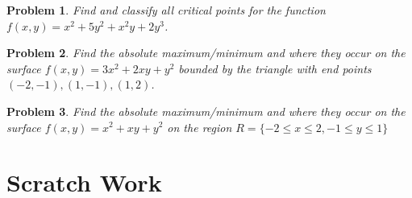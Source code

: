 \documentclass[11pt]{article}
\newtheorem{problem}{Problem}
\begin{document}
\begin{problem}
    Find and classify \emph{all} critical points for the function $f(x,y) = x^2+5y^2+x^2y+2y^3$.
\end{problem}

\newpage


\begin{problem}
    Find the absolute maximum/minimum and where they occur on the surface $f(x,y) = 3x^2+2xy+y^2$ bounded by the triangle with end points $(-2,-1),(1,-1),(1,2)$.
\end{problem}

\newpage

\begin{problem}
    Find the absolute maximum/minimum and where they occur on the surface $f(x,y) = x^2+xy+y^2$ on the region $R= \{-2\leq x\leq 2, -1\leq y\leq 1\}$
\end{problem}



\newpage

\section{Scratch Work}
\end{document}
